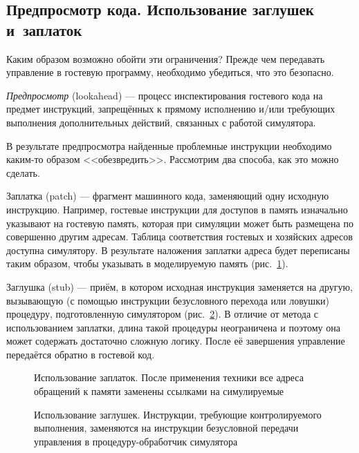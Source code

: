 \subsection[Предпросмотр кода]{Предпросмотр кода. Использование заглушек и~заплаток}

Каким образом возможно обойти эти ограничения? Прежде чем передавать управление в гостевую программу, необходимо убедиться, что это безопасно. 

\textit{Предпросмотр} (\abbr lookahead) --- процесс инспектирования гостевого кода на предмет инструкций, запрещённых к прямому исполнению и/или требующих выполнения дополнительных действий, связанных с работой симулятора.

В результате предпросмотра найденные проблемные инструкции необходимо каким-то образом <<обезвредить>>. Рассмотрим два способа, как это можно сделать.

\begin{description*}
\item[Заплатка (\abbr patch)] --- фрагмент машинного кода, заменяющий одну исходную инструкцию. Например, гостевые инструкции для доступов в память изначально указывают на гостевую память, которая при симуляции может быть размещена по совершенно другим адресам. Таблица соответствия гостевых и хозяйских адресов доступна симулятору. В результате наложения заплатки адреса будет переписаны таким образом, чтобы указывать в моделируемую память (рис.~\ref{fig:patching}). 

\item[Заглушка (\abbr stub)] --- приём, в котором исходная инструкция заменяется на другую, вызывающую (с помощью инструкции безусловного перехода или ловушки) процедуру, подготовленную симулятором (рис.~\ref{fig:stubbing}). В отличие от метода с использованием заплатки, длина такой процедуры неограничена и поэтому она может содержать достаточно сложную логику. После её завершения управление передаётся обратно в гостевой код.
\end{description*}

\begin{figure}[htpb]
    \centering
    \caption[Использование заплаток]{Использование заплаток. После применения техники все адреса обращений к памяти заменены ссылками на симулируемые}
    \label{fig:patching}
\end{figure}

\begin{figure}[htpb]
    \centering
    \caption[Использование заглушек]{Использование заглушек. Инструкции, требующие контролируемого выполнения, заменяются на инструкции безусловной передачи управления в процедуру-обработчик симулятора}
    \label{fig:stubbing}
\end{figure}

